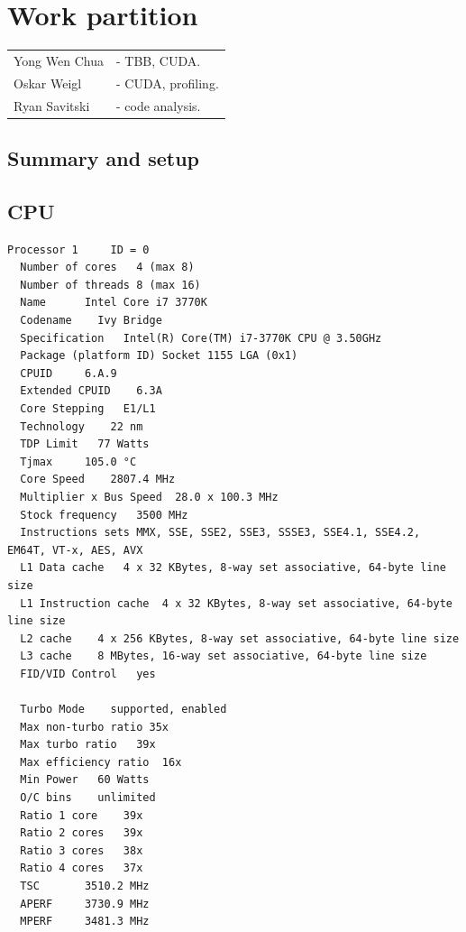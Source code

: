 \documentclass[11pt, oneside, a4paper]{article}
\begin{document}
\section{Work partition} %
\label{sec:work_partition}
\begin{tabular}{ l l  }
Yong Wen Chua & - TBB, CUDA. \\
Oskar Weigl & - CUDA, profiling. \\
Ryan Savitski & - code analysis. \\
\end{tabular}

\clearpage
\begin{appendices}
\section{Summary and setup}

\subsection{CPU} %
\label{sub:cpu}

\begin{verbatim}
Processor 1     ID = 0
  Number of cores   4 (max 8)
  Number of threads 8 (max 16)
  Name      Intel Core i7 3770K
  Codename    Ivy Bridge
  Specification   Intel(R) Core(TM) i7-3770K CPU @ 3.50GHz
  Package (platform ID) Socket 1155 LGA (0x1)
  CPUID     6.A.9
  Extended CPUID    6.3A
  Core Stepping   E1/L1
  Technology    22 nm
  TDP Limit   77 Watts
  Tjmax     105.0 °C
  Core Speed    2807.4 MHz
  Multiplier x Bus Speed  28.0 x 100.3 MHz
  Stock frequency   3500 MHz
  Instructions sets MMX, SSE, SSE2, SSE3, SSSE3, SSE4.1, SSE4.2, EM64T, VT-x, AES, AVX
  L1 Data cache   4 x 32 KBytes, 8-way set associative, 64-byte line size
  L1 Instruction cache  4 x 32 KBytes, 8-way set associative, 64-byte line size
  L2 cache    4 x 256 KBytes, 8-way set associative, 64-byte line size
  L3 cache    8 MBytes, 16-way set associative, 64-byte line size
  FID/VID Control   yes

  Turbo Mode    supported, enabled
  Max non-turbo ratio 35x
  Max turbo ratio   39x
  Max efficiency ratio  16x
  Min Power   60 Watts
  O/C bins    unlimited
  Ratio 1 core    39x
  Ratio 2 cores   39x
  Ratio 3 cores   38x
  Ratio 4 cores   37x
  TSC       3510.2 MHz
  APERF     3730.9 MHz
  MPERF     3481.3 MHz
\end{verbatim}

\clearpage


\end{appendices}
\end{document}
